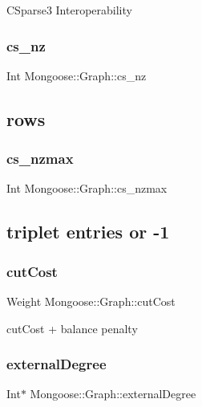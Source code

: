 C\+Sparse3 Interoperability \hypertarget{class_mongoose_1_1_graph_aa580ced39fb66fc39afed15d8b9a76fa}{}\label{class_mongoose_1_1_graph_aa580ced39fb66fc39afed15d8b9a76fa} 
\subsubsection{\texorpdfstring{cs\+\_\+nz}{cs\_nz}}
{\footnotesize\ttfamily Int Mongoose\+::\+Graph\+::cs\+\_\+nz}

\subsection*{rows}\hypertarget{class_mongoose_1_1_graph_a4535d32201569d087ba13f184131cfe2}{}\label{class_mongoose_1_1_graph_a4535d32201569d087ba13f184131cfe2} 
\subsubsection{\texorpdfstring{cs\+\_\+nzmax}{cs\_nzmax}}
{\footnotesize\ttfamily Int Mongoose\+::\+Graph\+::cs\+\_\+nzmax}

\subsection*{triplet entries or -\/1}\hypertarget{class_mongoose_1_1_graph_aff1e7ee84f684c3966f1b87a1138b5f8}{}\label{class_mongoose_1_1_graph_aff1e7ee84f684c3966f1b87a1138b5f8} 
\subsubsection{\texorpdfstring{cut\+Cost}{cutCost}}
{\footnotesize\ttfamily Weight Mongoose\+::\+Graph\+::cut\+Cost}

cut\+Cost + balance penalty \hypertarget{class_mongoose_1_1_graph_a60624f281d036722273fbb61c3780efa}{}\label{class_mongoose_1_1_graph_a60624f281d036722273fbb61c3780efa} 
\subsubsection{\texorpdfstring{external\+Degree}{externalDegree}}
{\footnotesize\ttfamily Int$\ast$ Mongoose\+::\+Graph\+::external\+Degree}

